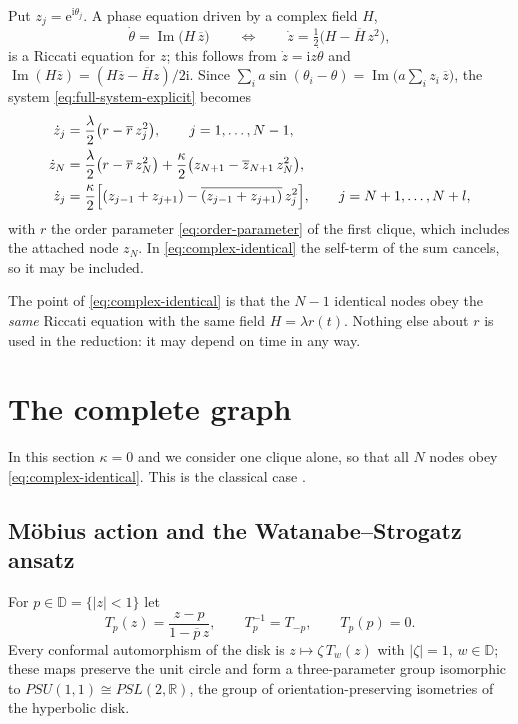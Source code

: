 \documentclass[a4paper,11pt]{article}
\newcommand{\conj}[1]{\overline{#1}}
\newcommand{\T}{T}                       %
\newcommand{\D}{\mathbb{D}}
\newcommand{\im}{\operatorname{Im}}
\newcommand{\e}{\mathrm{e}}
\newcommand{\ii}{\mathrm{i}}
\theoremstyle{remark}
\begin{document}
Put $z_j=\e^{\ii\theta_j}$. A phase equation driven by a complex field $H$,
\begin{equation}\label{eq:riccati}
\dot\theta=\im\bigl(H\,\conj z\bigr)
\qquad\Longleftrightarrow\qquad
\dot z=\tfrac12\bigl(H-\conj H\,z^2\bigr),
\end{equation}
is a Riccati equation for $z$; this follows from $\dot z=\ii z\dot\theta$ and
$\im(H\conj z)=(H\conj z-\conj H z)/2\ii$. Since
$\sum_i a\sin(\theta_i-\theta)=\im\bigl(a\sum_i z_i\,\conj z\bigr)$, the system
\eqref{eq:full-system-explicit} becomes
\begin{align}
\dot z_j&=\frac\lambda2\bigl(r-\conj r\,z_j^2\bigr), \qquad j=1,\dots,N-1,
\label{eq:complex-identical}\\
\dot z_N&=\frac\lambda2\bigl(r-\conj r\,z_N^2\bigr)
+\frac\kappa2\bigl(z_{N+1}-\conj z_{N+1}\,z_N^2\bigr),
\label{eq:complex-attached}\\
\dot z_j&=\frac\kappa2\Bigl[(z_{j-1}+z_{j+1})-\conj{(z_{j-1}+z_{j+1})}\,z_j^2\Bigr],
\qquad j=N+1,\dots,N+l,
\label{eq:complex-chain}
\end{align}
with $r$ the order parameter \eqref{eq:order-parameter} of the first clique,
which includes the attached node $z_N$. In \eqref{eq:complex-identical} the
self-term of the sum cancels, so it may be included.

The point of \eqref{eq:complex-identical} is that the $N-1$ identical nodes obey
the \emph{same} Riccati equation with the same field $H=\lambda r(t)$. Nothing
else about $r$ is used in the reduction: it may depend on time in any way.

\section{The complete graph}\label{sec:complete}

In this section $\kappa=0$ and we consider one clique alone, so that all $N$
nodes obey \eqref{eq:complex-identical}. This is the classical case
\cite{WatanabeStrogatz1994,MarvelMirolloStrogatz2009,ChenEngelbrechtMirollo2017}.

\subsection{M\"obius action and the Watanabe--Strogatz ansatz}

For $p\in\D=\{|z|<1\}$ let
\begin{equation}\label{eq:mobius}
\T_p(z)=\frac{z-p}{1-\conj p\,z},\qquad \T_p^{-1}=\T_{-p},\qquad \T_p(p)=0 .
\end{equation}
Every conformal automorphism of the disk is $z\mapsto\zeta\,\T_w(z)$ with
$|\zeta|=1$, $w\in\D$; these maps preserve the unit circle and form a
three-parameter group isomorphic to $PSU(1,1)\cong PSL(2,\mathbb R)$, the group
of orientation-preserving isometries of the hyperbolic disk.
\end{document}
